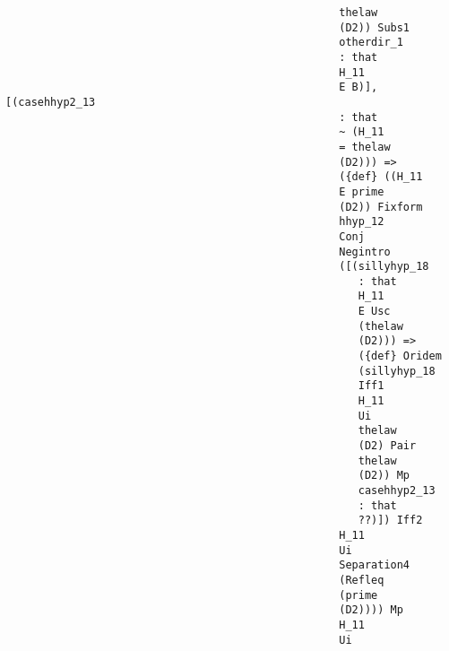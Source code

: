 \documentclass[12pt]{article}
\begin{document}
\begin{verbatim}
                                                    thelaw 
                                                    (D2)) Subs1 
                                                    otherdir_1 
                                                    : that 
                                                    H_11 
                                                    E B)], [(casehhyp2_13 
                                                    : that 
                                                    ~ (H_11 
                                                    = thelaw 
                                                    (D2))) => 
                                                    ({def} ((H_11 
                                                    E prime 
                                                    (D2)) Fixform 
                                                    hhyp_12 
                                                    Conj 
                                                    Negintro 
                                                    ([(sillyhyp_18 
                                                       : that 
                                                       H_11 
                                                       E Usc 
                                                       (thelaw 
                                                       (D2))) => 
                                                       ({def} Oridem 
                                                       (sillyhyp_18 
                                                       Iff1 
                                                       H_11 
                                                       Ui 
                                                       thelaw 
                                                       (D2) Pair 
                                                       thelaw 
                                                       (D2)) Mp 
                                                       casehhyp2_13 
                                                       : that 
                                                       ??)]) Iff2 
                                                    H_11 
                                                    Ui 
                                                    Separation4 
                                                    (Refleq 
                                                    (prime 
                                                    (D2)))) Mp 
                                                    H_11 
                                                    Ui 

\end{verbatim}
\end{document}
